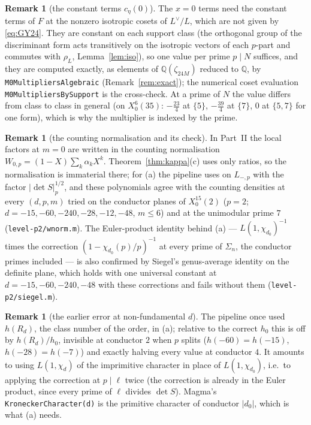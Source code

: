 \documentclass[11pt,reqno]{amsart}
\theoremstyle{plain}
\theoremstyle{definition}
\newtheorem{remark}[theorem]{Remark}
\newcommand{\Q}{\mathbb{Q}}
\newcommand{\Ldual}{L^{\vee}}
\begin{document}
\begin{remark}[the constant terms $c_{\eta}(0)$]\label{rem:ceta}
The $x=0$ terms need the constant terms of $F$ at the nonzero isotropic cosets of $\Ldual/L$,
which are not given by \eqref{eq:GY24}. They are constant on each support class (the orthogonal
group of the discriminant form acts transitively on the isotropic vectors of each $p$-part and
commutes with $\rho_L$, Lemma~\ref{lem:iso}), so one value per prime $p\mid N$ suffices, and they
are computed exactly, as elements of $\Q(\zeta_{24M})$ reduced to $\Q$, by
\texttt{M0MultipliersAlgebraic} (Remark~\ref{rem:exact}); the numerical coset evaluation
\texttt{M0MultipliersBySupport} is the cross-check. At a prime of $N$ the value differs from class
to class in general (on $X_0^6(35)$: $-\tfrac{23}4$ at $\{5\}$, $-\tfrac{39}4$ at $\{7\}$, $0$ at
$\{5,7\}$ for one form), which is why the multiplier is indexed by the prime.
\end{remark}

\begin{remark}[the counting normalisation and its check]\label{rem:count}
In Part~II the local factors at $m=0$ are written in the counting normalisation $W_{0,p}=(1-X)
\sum_k\alpha_kX^k$. Theorem~\ref{thm:kappa}(c) uses only ratios, so the normalisation is immaterial
there; for (a) the pipeline uses \cite[Thms.~4.3, 4.4]{KY} on $L_{-,p}$ with the factor
$|\det S|_p^{1/2}$, and these polynomials agree with the counting densities at every $(d,p,m)$
tried on the conductor planes of $X_0^{15}(2)$ ($p=2$; $d=-15,-60,-240,-28,-12,-48$, $m\le6$)
and at the unimodular prime $7$ (\texttt{level-p2/wnorm.m}). The Euler-product identity behind
(a) --- $L(1,\chi_{d_0})^{-1}$ times the correction $(1-\chi_{d_0}(p)/p)^{-1}$ at every prime of
$\Sigma_n$, the conductor primes included --- is also confirmed by Siegel's genus-average identity
on the definite plane, which holds with one universal constant at $d=-15,-60,-240,-48$ with these
corrections and fails without them (\texttt{level-p2/siegel.m}).
\end{remark}

\begin{remark}[the earlier error at non-fundamental $d$]\label{rem:mpos}
The pipeline once used $h(R_d)$, the class number of the order, in (a); relative to the correct
$h_0$ this is off by $h(R_d)/h_0$, invisible at conductor $2$ when $p$ splits ($h(-60)=h(-15)$,
$h(-28)=h(-7)$) and exactly halving every value at conductor $4$. It amounts to using
$L(1,\chi_d)$ of the imprimitive character in place of $L(1,\chi_{d_0})$, i.e.\ to applying the
correction at $p\mid\ell$ twice (the correction is already in the Euler product, since every prime
of $\ell$ divides $\det S$). Magma's \texttt{KroneckerCharacter(d)} is the primitive character of
conductor $|d_0|$, which is what (a) needs.
\end{remark}
\end{document}
